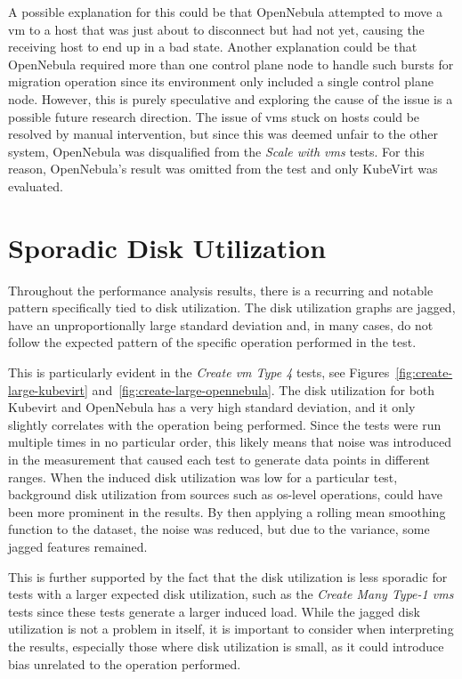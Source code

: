 \documentclass{kththesis}
\begin{document}
\begin{enumerate}
A possible explanation for this could be that OpenNebula attempted to move a \Gls{vm} to a host that was just about to disconnect but had not yet, causing the receiving host to end up in a bad state. Another explanation could be that OpenNebula required more than one control plane node to handle such bursts for migration operation since its environment only included a single control plane node. However, this is purely speculative and exploring the cause of the issue is a possible future research direction. The issue of \Glspl{vm} stuck on hosts could be resolved by manual intervention, but since this was deemed unfair to the other system, OpenNebula was disqualified from the \textit{Scale with \Glspl{vm}} tests. For this reason, OpenNebula's result was omitted from the test and only KubeVirt was evaluated.

\section{Sporadic Disk Utilization}
Throughout the performance analysis results, there is a recurring and notable pattern specifically tied to disk utilization. The disk utilization graphs are jagged, have an unproportionally large standard deviation and, in many cases, do not follow the expected pattern of the specific operation performed in the test. 

This is particularly evident in the \textit{Create \Gls{vm} Type 4} tests, see Figures\ \ref{fig:create-large-kubevirt} and\ \ref{fig:create-large-opennebula}. The disk utilization for both Kubevirt and OpenNebula has a very high standard deviation, and it only slightly correlates with the operation being performed. Since the tests were run multiple times in no particular order, this likely means that noise was introduced in the measurement that caused each test to generate data points in different ranges. When the induced disk utilization was low for a particular test, background disk utilization from sources such as \Gls{os}-level operations, could have been more prominent in the results. By then applying a rolling mean smoothing function to the dataset, the noise was reduced, but due to the variance, some jagged features remained. 

This is further supported by the fact that the disk utilization is less sporadic for tests with a larger expected disk utilization, such as the \textit{Create Many Type-1 \Glspl{vm}} tests since these tests generate a larger induced load. While the jagged disk utilization is not a problem in itself, it is important to consider when interpreting the results, especially those where disk utilization is small, as it could introduce bias unrelated to the operation performed.


\end{enumerate}
\end{document}
